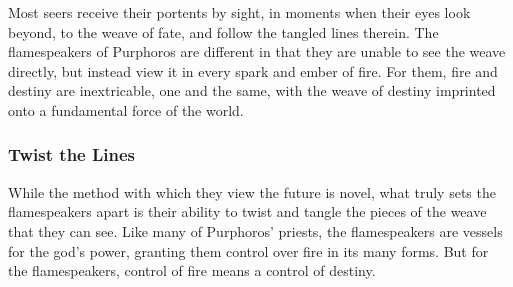         Most seers receive their portents by sight, in moments when their eyes look beyond, to the weave of fate, and follow the tangled lines therein.
        The flamespeakers of Purphoros are different in that they are unable to see the weave directly, but instead view it in every spark and ember of fire.
        For them, fire and destiny are inextricable, one and the same, with the weave of destiny imprinted onto a fundamental force of the world.

    \subsubsection{Twist the Lines}
        While the method with which they view the future is novel, what truly sets the flamespeakers apart is their ability to twist and tangle the pieces of the weave that they can see.
        Like many of Purphoros' priests, the flamespeakers are vessels for the god's power, granting them control over fire in its many forms.
        But for the flamespeakers, control of fire means a control of destiny.

